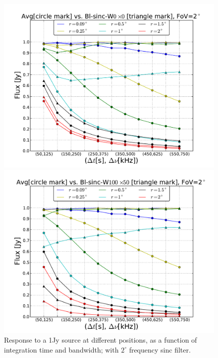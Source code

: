 \documentclass[useAMS,usenatbib]{mn2e}
\begin{document}
\begin{figure}
  \centering
\begin{minipage}{0.36\linewidth}\includegraphics[width=1\textwidth]{./Figures/max-integ-timefreq-sinc-w1x1-fov2.pdf}
    \caption{Response to a 1Jy source at different positions, as a function of integration time and bandwidth; with $2^{\circ}$ frequency 
sinc filter.}
    \label{fig:max-integ-timefreq-sinc-w1x1-fov2}\end{minipage}
 \hspace{1cm}
\begin{minipage}{0.36\linewidth}\includegraphics[width=1\textwidth]{./Figures/max-integ-timefreq-sinc-w100x50-fov2.pdf}

\end{minipage}
\end{figure}
\end{document}
